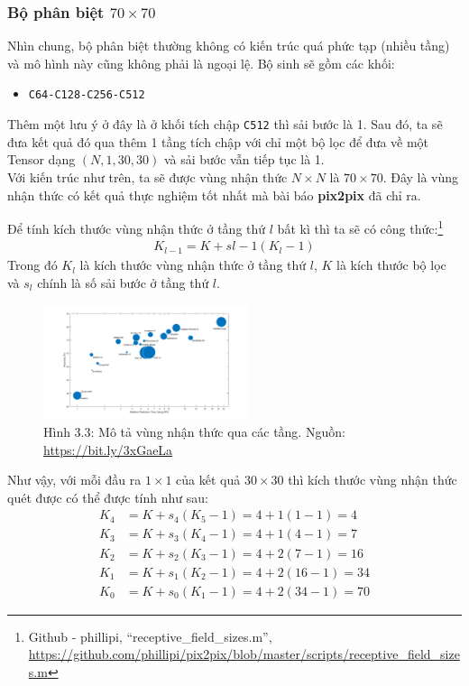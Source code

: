 \documentclass[a4paper]{article}
\begin{document}
\subsubsection{Bộ phân biệt $70 \times 70$}
Nhìn chung, bộ phân biệt thường không có kiến trúc quá phức tạp (nhiều tầng) và mô hình này cũng không phải là ngoại lệ. Bộ sinh sẽ gồm các khối:

\begin{itemize}
    \item \texttt{C64-C128-C256-C512}
\end{itemize}

\noindent
Thêm một lưu ý ở đây là ở khối tích chập \texttt{C512} thì sải bước là 1. Sau đó, ta sẽ đưa kết quả đó qua thêm 1 tầng tích chập với chỉ một bộ lọc để đưa về một Tensor dạng $(N, 1, 30, 30)$ và sải bước vẫn tiếp tục là 1.\\
Với kiến trúc như trên, ta sẽ được vùng nhận thức $N \times N$ là $70 \times 70$. Đây là vùng nhận thức có kết quả thực nghiệm tốt nhất mà bài báo \textbf{pix2pix} đã chỉ ra.

\noindent
Để tính kích thước vùng nhận thức ở tầng thứ $l$ bất kì thì ta sẽ có công thức:\footnote{Github - phillipi, ``receptive\_field\_sizes.m'', \href{https://github.com/phillipi/pix2pix/blob/master/scripts/receptive\_field\_sizes.m}{https://github.com/phillipi/pix2pix/blob/master/scripts/receptive\_field\_sizes.m}}
\begin{align*}
    K_{l-1} = K + s{l-1}(K_{l} - 1)
\end{align*}
Trong đó $K_l$ là kích thước vùng nhận thức ở tầng thứ $l$, $K$ là kích thước bộ lọc và $s_{l}$ chính là số sải bước ở tầng thứ $l$.

\begin{figure}[h!]
\centering
\includegraphics[width=6cm]{images/3_3.png}
\caption{Hình 3.3: Mô tả vùng nhận thức qua các tầng. Nguồn: \href{https://bit.ly/3xGaeLa}{https://bit.ly/3xGaeLa}}
\end{figure}

\noindent
Như vậy, với mỗi đầu ra $1 \times 1$ của kết quả $30\times 30$ thì kích thước vùng nhận thức quét được có thể được tính như sau:
\begin{align*}
    K_4 &= K + s_4(K_5 - 1) = 4 + 1(1-1) = 4\\
    K_3 &= K + s_3(K_4 - 1) = 4 + 1(4-1) = 7\\
    K_2 &= K + s_2(K_3 - 1) = 4 + 2(7-1) = 16\\
    K_1 &= K + s_1(K_2 - 1) = 4 + 2(16-1) = 34\\
    K_0 &= K + s_0(K_1 - 1) = 4 + 2(34 - 1) = 70
\end{align*}
\end{document}
